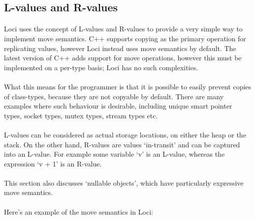 \documentclass[12pt,twoside,notitlepage]{report}
\begin{document}
\clearpage

\subsection{L-values and R-values}

\paragraph{}
Loci uses the concept of L-values and R-values to provide a very simple way to implement move semantics. C++ supports copying as the primary operation for replicating values, however Loci instead uses move semantics by default. The latest version of C++ adds support for move operations, however this must be implemented on a per-type basis; Loci has no such complexities.

\paragraph{}
What this means for the programmer is that it is possible to easily prevent copies of class-types, because they are not copyable by default. There are many examples where such behaviour is desirable, including unique smart pointer types, socket types, mutex types, stream types etc.

\paragraph{}
L-values can be considered as actual storage locations, on either the heap or the stack. On the other hand, R-values are values `in-transit' and can be captured into an L-value. For example some variable `v' is an L-value, whereas the expression `v + 1' is an R-value.

\paragraph{}
This section also discusses `nullable objects', which have particularly expressive move semantics.

\paragraph{}
Here's an example of the move semantics in Loci:
\end{document}
